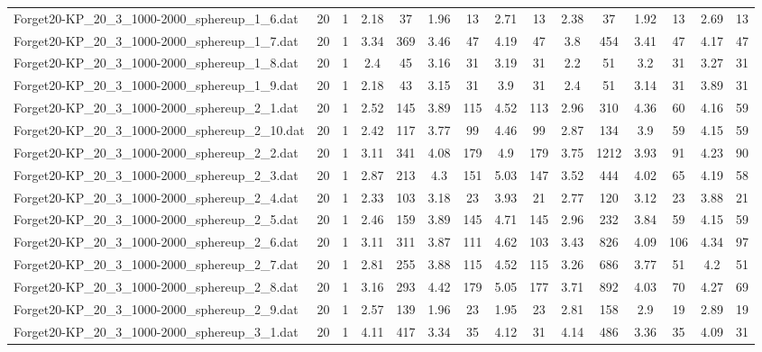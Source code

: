 \begin{table}[!ht]
{\begin{tabular}{lcccccccccccccc}
Forget20-KP\_20\_3\_1000-2000\_sphereup\_1\_6.dat & 20 & 1 & 2.18 & 37 & 1.96 & 13 & 2.71 & 13 & 2.38 & 37 & 1.92 & 13 & 2.69 & 13 \\
Forget20-KP\_20\_3\_1000-2000\_sphereup\_1\_7.dat & 20 & 1 & 3.34 & 369 & 3.46 & 47 & 4.19 & 47 & 3.8 & 454 & 3.41 & 47 & 4.17 & 47 \\
Forget20-KP\_20\_3\_1000-2000\_sphereup\_1\_8.dat & 20 & 1 & 2.4 & 45 & 3.16 & 31 & 3.19 & 31 & 2.2 & 51 & 3.2 & 31 & 3.27 & 31 \\
Forget20-KP\_20\_3\_1000-2000\_sphereup\_1\_9.dat & 20 & 1 & 2.18 & 43 & 3.15 & 31 & 3.9 & 31 & 2.4 & 51 & 3.14 & 31 & 3.89 & 31 \\
Forget20-KP\_20\_3\_1000-2000\_sphereup\_2\_1.dat & 20 & 1 & 2.52 & 145 & 3.89 & 115 & 4.52 & 113 & 2.96 & 310 & 4.36 & 60 & 4.16 & 59 \\
Forget20-KP\_20\_3\_1000-2000\_sphereup\_2\_10.dat & 20 & 1 & 2.42 & 117 & 3.77 & 99 & 4.46 & 99 & 2.87 & 134 & 3.9 & 59 & 4.15 & 59 \\
Forget20-KP\_20\_3\_1000-2000\_sphereup\_2\_2.dat & 20 & 1 & 3.11 & 341 & 4.08 & 179 & 4.9 & 179 & 3.75 & 1212 & 3.93 & 91 & 4.23 & 90 \\
Forget20-KP\_20\_3\_1000-2000\_sphereup\_2\_3.dat & 20 & 1 & 2.87 & 213 & 4.3 & 151 & 5.03 & 147 & 3.52 & 444 & 4.02 & 65 & 4.19 & 58 \\
Forget20-KP\_20\_3\_1000-2000\_sphereup\_2\_4.dat & 20 & 1 & 2.33 & 103 & 3.18 & 23 & 3.93 & 21 & 2.77 & 120 & 3.12 & 23 & 3.88 & 21 \\
Forget20-KP\_20\_3\_1000-2000\_sphereup\_2\_5.dat & 20 & 1 & 2.46 & 159 & 3.89 & 145 & 4.71 & 145 & 2.96 & 232 & 3.84 & 59 & 4.15 & 59 \\
Forget20-KP\_20\_3\_1000-2000\_sphereup\_2\_6.dat & 20 & 1 & 3.11 & 311 & 3.87 & 111 & 4.62 & 103 & 3.43 & 826 & 4.09 & 106 & 4.34 & 97 \\
Forget20-KP\_20\_3\_1000-2000\_sphereup\_2\_7.dat & 20 & 1 & 2.81 & 255 & 3.88 & 115 & 4.52 & 115 & 3.26 & 686 & 3.77 & 51 & 4.2 & 51 \\
Forget20-KP\_20\_3\_1000-2000\_sphereup\_2\_8.dat & 20 & 1 & 3.16 & 293 & 4.42 & 179 & 5.05 & 177 & 3.71 & 892 & 4.03 & 70 & 4.27 & 69 \\
Forget20-KP\_20\_3\_1000-2000\_sphereup\_2\_9.dat & 20 & 1 & 2.57 & 139 & 1.96 & 23 & 1.95 & 23 & 2.81 & 158 & 2.9 & 19 & 2.89 & 19 \\
Forget20-KP\_20\_3\_1000-2000\_sphereup\_3\_1.dat & 20 & 1 & 4.11 & 417 & 3.34 & 35 & 4.12 & 31 & 4.14 & 486 & 3.36 & 35 & 4.09 & 31 \\

\end{tabular}}
\end{table}
